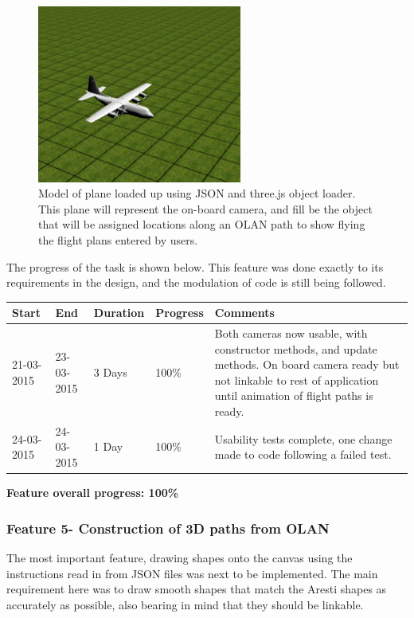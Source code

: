 \begin{figure}[h!]
  \centering
      \includegraphics[width=0.6\textwidth]{images/plane.png}
  \caption{Model of plane loaded up using JSON and three.js object loader. This plane will represent the on-board camera, and fill be the object that will be assigned locations along an OLAN path to show flying the flight plans entered by users.}
  \label{fig:plane}
\end{figure}

The progress of the task is shown below. This feature was done exactly to its requirements in the design, and the modulation of code is still being followed.

\begin{table}[h]
\begin{tabular}{|l|l|l|l|p{7cm}|}
\hline
\textbf{Start} & \textbf{End} & \textbf{Duration} & \textbf{Progress} & \textbf{Comments}                                                                                                     \\ \hline
21-03-2015     & 23-03-2015   & 3 Days            & 100\%             &  Both cameras now usable, with constructor methods, and update methods. On board camera ready but not linkable to rest of application until animation of flight paths is ready.\\ \hline
24-03-2015     & 24-03-2015   & 1 Day            & 100\%             &  Usability tests complete, one change made to code following a failed test. \\ \hline
\end{tabular}
\end{table}

\textbf{Feature overall progress: 100\%}

\subsubsection{Feature 5- Construction of 3D paths from OLAN}
The most important feature, drawing shapes onto the canvas using the instructions read in from JSON files was next to be implemented. The main requirement here was to draw smooth shapes that match the Aresti shapes as accurately as possible, also bearing in mind that they should be linkable.

